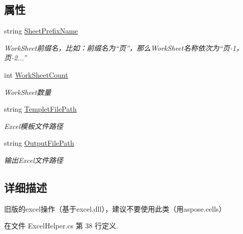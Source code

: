 \subsection*{属性}
\begin{DoxyCompactItemize}
\item 
string \hyperlink{class_x_c_l_net_tools_1_1_data_handler_1_1_excel_helper_a19d5234b9309942b87041f70bef91647}{Sheet\-Prefix\-Name}
\begin{DoxyCompactList}\small\item\em Work\-Sheet前缀名，比如：前缀名为“页”，那么\-Work\-Sheet名称依次为“页-\/1，页-\/2...” \end{DoxyCompactList}\item 
int \hyperlink{class_x_c_l_net_tools_1_1_data_handler_1_1_excel_helper_ab8d2677869ff64e25bbe54623ef9fa86}{Work\-Sheet\-Count}
\begin{DoxyCompactList}\small\item\em Work\-Sheet数量 \end{DoxyCompactList}\item 
string \hyperlink{class_x_c_l_net_tools_1_1_data_handler_1_1_excel_helper_a0e4501c60ef6446d0fe8151a6e58fca4}{Templet\-File\-Path}
\begin{DoxyCompactList}\small\item\em Excel模板文件路径 \end{DoxyCompactList}\item 
string \hyperlink{class_x_c_l_net_tools_1_1_data_handler_1_1_excel_helper_ada3dfa77cf3ac278ee83281f04707aa3}{Output\-File\-Path}
\begin{DoxyCompactList}\small\item\em 输出\-Excel文件路径 \end{DoxyCompactList}\end{DoxyCompactItemize}


\subsection{详细描述}
旧版的excel操作（基于excel.\-dll），建议不要使用此类（用aspose.\-cells） 



在文件 Excel\-Helper.\-cs 第 38 行定义.



